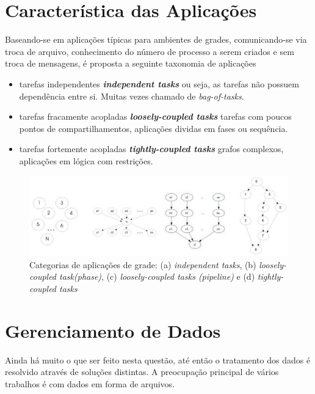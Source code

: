 \section{Característica das Aplicações}

Baseando-se em aplicações típicas para ambientes de grades, comunicando-se via troca de arquivo, conhecimento do número de processo a serem criados e sem troca de mensagens, é proposta a seguinte taxonomia de aplicações \cite{Vargas2003, Vargas2005, Mangan2006}

\begin{itemize}
	\item tarefas independentes \emph{\textbf{independent tasks}} ou seja, as tarefas não possuem dependência entre si. Muitas vezes chamado de \emph{bag-of-tasks}.
	\item tarefas fracamente acopladas \emph{\textbf{loosely-coupled tasks}} tarefas com poucos pontos de compartilhamentos, aplicações dividas em fases ou sequência.
	\item tarefas fortemente acopladas \emph{\textbf{tightly-coupled tasks}} grafos complexos, aplicações em lógica com restrições.
\end{itemize}

\begin{figure}[htb]
\begin{center}
\includegraphics[scale=0.5]{./img/TaxonomiaAplicacoes.eps}
\caption{Categorias de aplicações de grade: (a) \emph{independent tasks}, (b) \emph{loosely-coupled task(phase)}, (c) \emph{loosely-coupled tasks (pipeline)} e (d) \emph{tightly-coupled tasks}}
\label{fig:Taxonomia_Aplicacoes}
\end{center}
\end{figure}

\section{Gerenciamento de Dados}

Ainda há muito o que ser feito nesta questão, até então o tratamento dos dados é resolvido através de soluções distintas. A preocupação principal de vários trabalhos \cite
{GridFTP,LegionFS} é com dados em forma de arquivos.

